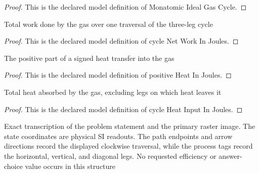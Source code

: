 \begin{proof}
  This is the declared model definition of Monatomic Ideal Gas Cycle.
\end{proof}
\begin{definition}
  \label{def:physics:phyx-mini-0352:phyxminiproblems-problemphyxmini0352-cyclenetworkinjoules}
  Total work done by the gas over one traversal of the three-leg cycle
\end{definition}
\begin{proof}
  This is the declared model definition of cycle Net Work In Joules.
\end{proof}
\begin{definition}
  \label{def:physics:phyx-mini-0352:phyxminiproblems-problemphyxmini0352-positiveheatinjoules}
  The positive part of a signed heat transfer into the gas
\end{definition}
\begin{proof}
  This is the declared model definition of positive Heat In Joules.
\end{proof}
\begin{definition}
  \label{def:physics:phyx-mini-0352:phyxminiproblems-problemphyxmini0352-cycleheatinputinjoules}
  Total heat absorbed by the gas, excluding legs on which heat leaves it
\end{definition}
\begin{proof}
  This is the declared model definition of cycle Heat Input In Joules.
\end{proof}
\begin{definition}
  \label{def:physics:phyx-mini-0352:phyxminiproblems-problemphyxmini0352-matchesproblemandprimaryfigure}
  Exact transcription of the problem statement and the primary raster image. The state coordinates are physical SI readouts. The path endpoints and arrow directions record the displayed clockwise traversal, while the process tags record the horizontal, vertical, and diagonal legs. No requested efficiency or answer-choice value occurs in this structure
\end{definition}
